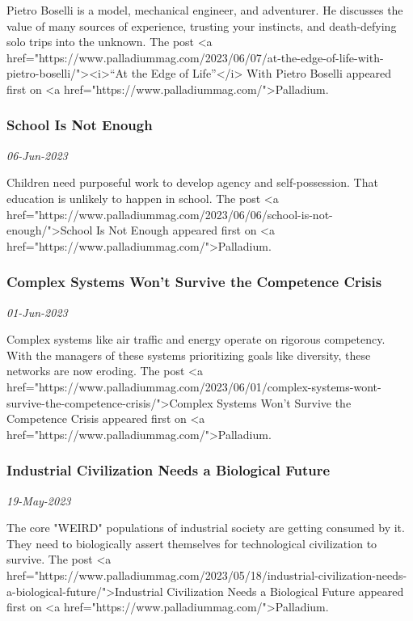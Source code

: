 Pietro Boselli is a model, mechanical engineer, and adventurer. He discusses the value of many sources of experience, trusting your instincts, and death-defying solo trips into the unknown.
The post <a href="https://www.palladiummag.com/2023/06/07/at-the-edge-of-life-with-pietro-boselli/"><i>“At the Edge of Life”</i> With Pietro Boselli
 appeared first on <a href="https://www.palladiummag.com/">Palladium.
\subsubsection{School Is Not Enough \href{https://www.palladiummag.com/2023/06/06/school-is-not-enough/}{}}
\textit{06-Jun-2023}

Children need purposeful work to develop agency and self-possession. That education is unlikely to happen in school.
The post <a href="https://www.palladiummag.com/2023/06/06/school-is-not-enough/">School Is Not Enough
 appeared first on <a href="https://www.palladiummag.com/">Palladium.
\subsubsection{Complex Systems Won’t Survive the Competence Crisis \href{https://www.palladiummag.com/2023/06/01/complex-systems-wont-survive-the-competence-crisis/}{}}
\textit{01-Jun-2023}

Complex systems like air traffic and energy operate on rigorous competency. With the managers of these systems prioritizing goals like diversity, these networks are now eroding.
The post <a href="https://www.palladiummag.com/2023/06/01/complex-systems-wont-survive-the-competence-crisis/">Complex Systems Won’t Survive the Competence Crisis
 appeared first on <a href="https://www.palladiummag.com/">Palladium.
\subsubsection{Industrial Civilization Needs a Biological Future \href{https://www.palladiummag.com/2023/05/18/industrial-civilization-needs-a-biological-future/}{}}
\textit{19-May-2023}

The core "WEIRD" populations of industrial society are getting consumed by it. They need to biologically assert themselves for technological civilization to survive.
The post <a href="https://www.palladiummag.com/2023/05/18/industrial-civilization-needs-a-biological-future/">Industrial Civilization Needs a Biological Future
 appeared first on <a href="https://www.palladiummag.com/">Palladium.
